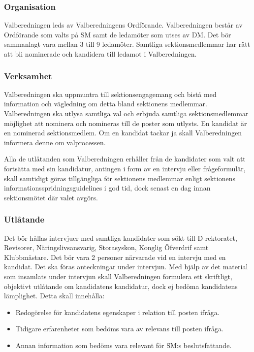\documentclass{dgovdoc}
\begin{document}
\subsubsection{Organisation}

Valberedningen leds av Valberedningens Ordförande. Valberedningen består av
Ordförande som valts på SM samt de ledamöter som utses av DM. Det bör
sammanlagt vara mellan 3 till 9 ledamöter. Samtliga sektionsmedlemmar
har rätt att bli nominerade och kandidera till ledamot i Valberedningen.

\subsubsection{Verksamhet}

Valberedningen ska uppmuntra till sektionsengagemang och bistå med information
och vägledning om detta bland sektionens medlemmar. Valberedningen ska utlysa
samtliga val och erbjuda samtliga sektionsmedlemmar möjlighet att nominera och
nomineras till de poster som utlysts. En kandidat är en nominerad sektionsmedlem.
Om en kandidat tackar ja skall Valberedningen informera denne om valprocessen.

Alla de utlåtanden som Valberedningen erhåller från de kandidater som valt att
fortsätta med sin kandidatur, antingen i form av en intervju eller frågeformulär,
skall samtidigt göras tillgängliga för sektionens medlemmar enligt sektionens
informationsspridningsguidelines i god tid, dock senast en dag innan sektionsmötet
där valet avgörs.

\subsubsection{Utlåtande}

Det bör hållas intervjuer med samtliga kandidater som sökt till D-rektoratet,
Revisorer, Näringslivsansvarig, Storasyskon, Konglig Öfverdrif samt Klubbmästare.
Det bör vara 2 personer närvarade vid en intervju med en kandidat. Det ska föras
anteckningar under intervjun. Med hjälp av det material som insamlats under
intervjun skall Valberedningen formulera ett skriftligt, objektivt utlåtande om
kandidatens kandidatur, dock ej bedöma kandidatens lämplighet. Detta skall innehålla:

\begin{itemize}
\item Redogörelse för kandidatens egenskaper i relation till posten ifråga.
\item Tidigare erfarenheter som bedöms vara av relevans till posten ifråga.
\item Annan information som bedöms vara relevant för SM:s beslutsfattande.
\end{itemize}
\end{document}
